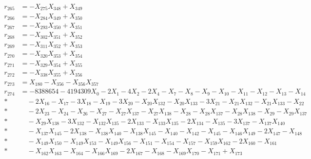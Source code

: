 \begin{align*}
r_{265} &= -X_{275}X_{348} + X_{349} \\[3pt]
r_{266} &= -X_{284}X_{349} + X_{350} \\[3pt]
r_{267} &= -X_{293}X_{350} + X_{351} \\[3pt]
r_{268} &= -X_{302}X_{351} + X_{352} \\[3pt]
r_{269} &= -X_{311}X_{352} + X_{353} \\[3pt]
r_{270} &= -X_{320}X_{353} + X_{354} \\[3pt]
r_{271} &= -X_{329}X_{354} + X_{355} \\[3pt]
r_{272} &= -X_{338}X_{355} + X_{356} \\[3pt]
r_{273} &= X_{180} - X_{356} - X_{356}X_{357} \\[3pt]
r_{274} &= -8388654 - 4194309X_{0} - 2X_{1} - 4X_{2} - 2X_{4} - X_{7} - X_{8} - X_{9} - X_{10} - X_{11} - X_{12} - X_{13} - X_{14} \\*
&\quad  - 2X_{16} - X_{17} - 3X_{18} - X_{19} - 3X_{20} - X_{20}X_{132} - X_{20}X_{133} - 3X_{21} - X_{21}X_{132} - X_{21}X_{133} - X_{22} \\*
&\quad  - 2X_{23} - X_{24} - X_{26} - X_{27} - X_{27}X_{137} - X_{27}X_{138} - X_{28} - X_{28}X_{137} - X_{28}X_{138} - X_{29} - X_{29}X_{137} \\*
&\quad  - X_{29}X_{138} - 3X_{132} - X_{132}X_{135} - 2X_{133} - X_{133}X_{135} - 2X_{134} - X_{135} - 3X_{137} - X_{137}X_{140} \\*
&\quad  - X_{137}X_{145} - 2X_{138} - X_{138}X_{140} - X_{138}X_{145} - X_{140} - X_{142} - X_{145} - X_{146}X_{149} - 2X_{147} - X_{148} \\*
&\quad  - X_{149}X_{150} - X_{149}X_{153} - X_{149}X_{156} - X_{151} - X_{154} - X_{157} - X_{159}X_{162} - 2X_{160} - X_{161} \\*
&\quad  - X_{162}X_{163} - X_{164} - X_{166}X_{169} - 2X_{167} - X_{168} - X_{169}X_{170} - X_{171} + X_{173}
\end{align*}
\endgroup
